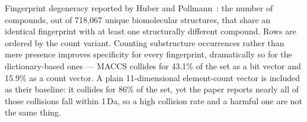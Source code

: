 \begin{table}[t]
\caption{Fingerprint degeneracy reported by Huber and Pollmann~\cite{Huber2026}: the
number of compounds, out of 718{,}067 unique biomolecular structures, that share an
identical fingerprint with at least one structurally different compound. Rows are ordered
by the count variant. Counting substructure occurrences rather than mere presence improves
specificity for every fingerprint, dramatically so for the dictionary-based ones --- MACCS
collides for 43.1\% of the set as a bit vector and 15.9\% as a count vector. A plain
11-dimensional element-count vector is included as their baseline: it collides for 86\% of
the set, yet the paper reports nearly all of those collisions fall within 1\,Da, so a high
collision rate and a harmful one are not the same thing.}
\label{tab:fp-duplicates}
\end{table}
